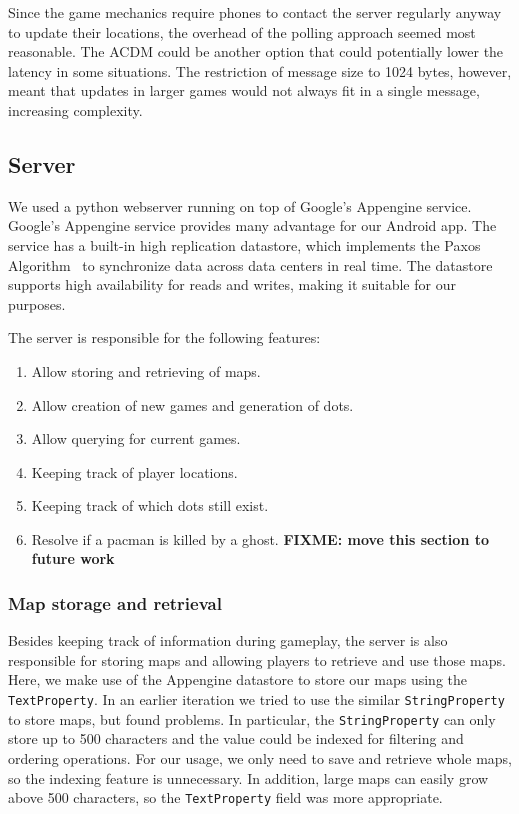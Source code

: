 \documentclass{acm_proc_article-sp}
\newcommand{\FIXME}[1]{{\color{red}\textbf{FIXME: #1}}}
\begin{document}
Since the game mechanics require phones to contact the server regularly anyway
to update their locations, the overhead of the polling approach seemed most
reasonable. The ACDM could be another option that could potentially lower the
latency in some situations. The restriction of message size to 1024 bytes,
however, meant that updates in larger games would not always fit in a single
message, increasing complexity.


\subsection{Server}

We used a python webserver running on top of Google's Appengine
service. Google's Appengine service provides many advantage for our
Android app. The service has a built-in high replication datastore,
which implements the Paxos Algorithm~\cite{lamport01paxos} to
synchronize data across data centers in real time. The datastore
supports high availability for reads and writes, making it suitable
for our purposes.

The server is responsible for the following features:

\begin{enumerate}
\item Allow storing and retrieving of maps.
\item Allow creation of new games and generation of dots.
\item Allow querying for current games.
\item Keeping track of player locations.
\item Keeping track of which dots still exist.
\item Resolve if a pacman is killed by a ghost. \FIXME{move this section to future work}
\end{enumerate}


\subsubsection{Map storage and retrieval}
Besides keeping track of information during gameplay, the server
is also responsible for storing maps and allowing players to retrieve
and use those maps. Here, we make use of the Appengine
datastore to store our maps using the \texttt{TextProperty}.
In an earlier iteration we tried to use the similar \texttt{StringProperty}
to store maps, but found problems. In particular, the
\texttt{StringProperty} can only store up to
500 characters and the value could be indexed for filtering and
ordering operations. For our usage, we only need to save and retrieve whole
maps, so the indexing feature is unnecessary. In addition, large maps
can easily grow above 500 characters, so the \texttt{TextProperty} field
was more appropriate.
\end{document}

